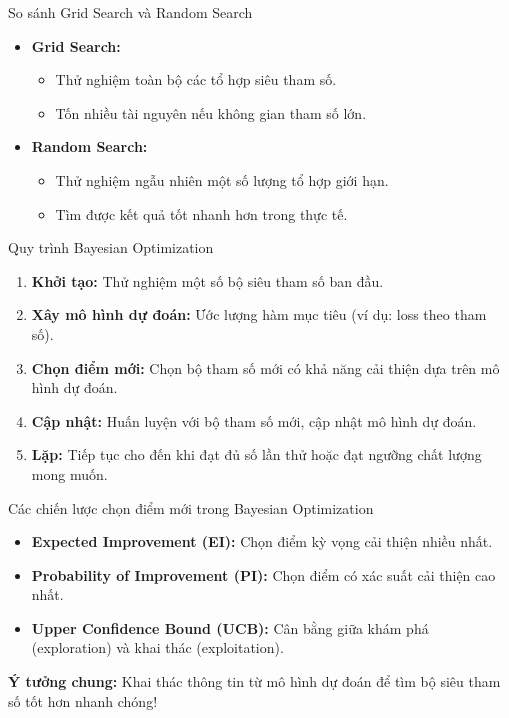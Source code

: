 \documentclass{beamer}
\begin{document}
\begin{frame}{So sánh Grid Search và Random Search}
    \begin{itemize}
        \item \textbf{Grid Search:}
        \begin{itemize}
            \item Thử nghiệm toàn bộ các tổ hợp siêu tham số.
            \item Tốn nhiều tài nguyên nếu không gian tham số lớn.
        \end{itemize}
        \item \textbf{Random Search:}
        \begin{itemize}
            \item Thử nghiệm ngẫu nhiên một số lượng tổ hợp giới hạn.
            \item Tìm được kết quả tốt nhanh hơn trong thực tế.
        \end{itemize}
    \end{itemize}
\end{frame}
    
\begin{frame}{Quy trình Bayesian Optimization}
    \begin{enumerate}
        \item \textbf{Khởi tạo:} Thử nghiệm một số bộ siêu tham số ban đầu.
        \item \textbf{Xây mô hình dự đoán:} Ước lượng hàm mục tiêu (ví dụ: loss theo tham số).
        \item \textbf{Chọn điểm mới:} Chọn bộ tham số mới có khả năng cải thiện dựa trên mô hình dự đoán.
        \item \textbf{Cập nhật:} Huấn luyện với bộ tham số mới, cập nhật mô hình dự đoán.
        \item \textbf{Lặp:} Tiếp tục cho đến khi đạt đủ số lần thử hoặc đạt ngưỡng chất lượng mong muốn.
    \end{enumerate}
\end{frame}

\begin{frame}{Các chiến lược chọn điểm mới trong Bayesian Optimization}
    \begin{itemize}
        \item \textbf{Expected Improvement (EI):} Chọn điểm kỳ vọng cải thiện nhiều nhất.
        \item \textbf{Probability of Improvement (PI):} Chọn điểm có xác suất cải thiện cao nhất.
        \item \textbf{Upper Confidence Bound (UCB):} Cân bằng giữa khám phá (exploration) và khai thác (exploitation).
    \end{itemize}
    \textbf{Ý tưởng chung:} Khai thác thông tin từ mô hình dự đoán để tìm bộ siêu tham số tốt hơn nhanh chóng!
\end{frame}
    
\end{document}
